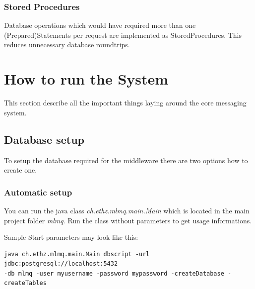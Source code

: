 \documentclass[a4paper]{article}
\begin{document}
\subsubsection{Stored Procedures}
Database operations which would have required more than one (Prepared)Statements per request are implemented as StoredProcedures. This reduces unnecessary database roundtrips.

\pagebreak



\pagebreak


\pagebreak



\pagebreak

\section{How to run the System}

This section describe all the important things laying around the core messaging system.

\subsection{Database setup}

To setup the database required for the middleware there are two options
how to create one.

\subsubsection{Automatic setup}
You can run the java class \textit{ch.ethz.mlmq.main.Main} which is located in the main project folder \textit{mlmq}. Run the class without parameters to get usage informations.

Sample Start parameters may look like this:

\begin{verbatim} 
java ch.ethz.mlmq.main.Main dbscript -url jdbc:postgresql://localhost:5432 
-db mlmq -user myusername -password mypassword -createDatabase -createTables
\end{verbatim}
\end{document}

